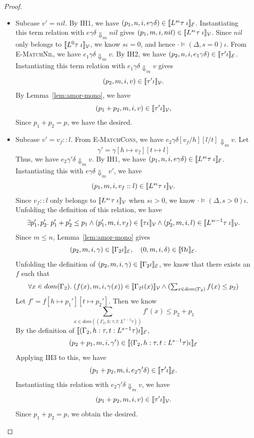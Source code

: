 \begin{proof}
\begin{itemize}
\begin{itemize}
  \item {Subcase $v'= nil$}.
By IH1, we have $(p_1,n,i,e\gamma\delta) \in \llbracket L^{s\iota}\tau\;\iota \rrbracket_{\mathcal{E}}$.
Instantiating this term relation with $e\gamma\delta\Downarrow_m nil$ gives
$(p_1,m,i,nil) \in \llbracket L^{s\iota}\tau\;\iota \rrbracket_{\mathcal{V}}$. Since $nil$ only belongs to $\llbracket L^0\tau\;\iota \rrbracket_{\mathcal{V}}$,
we know $s\iota = 0$, and hence $\cdot\models(\Delta,s=0)\iota$.
From \textsc{E-MatchNil}, we have $e_1\gamma\delta \Downarrow_m v$.
By IH2, we have $(p_2,n, i, e_1\gamma\delta) \in \llbracket \tau'\iota \rrbracket_{\mathcal{E}}$.
Instantiating this term relation with $e_1\gamma\delta \Downarrow_m v$ gives 
\[(p_2,m, i, v) \in \llbracket \tau'\iota \rrbracket_{\mathcal{V}}.\]
By Lemma~\ref{lem:amor-mono}, we have 
\[(p_1+p_2,m, i, v) \in \llbracket \tau'\iota \rrbracket_{\mathcal{V}},\]
Since $p_1+p_2 = p$, we have the desired.

\item Subcase $v'= v_f::l$.
From \textsc{E-MatchCons}, we have $e_2\gamma\delta[v_f/h][l/t]\Downarrow_m v$.
Let \[\gamma' = \gamma[h\mapsto v_f][t\mapsto l]\] Thus, we have $e_2\gamma'\delta\Downarrow_m v$.
By IH1, we have $(p_1,n,i,e\gamma\delta) \in \llbracket L^{s\iota}\tau\;\iota \rrbracket_{\mathcal{E}}$.
Instantiating this with $e\gamma\delta\Downarrow_m v'$, we have 
\[ (p_1,m, i,v_f::l) \in \llbracket L^{s\iota}\tau\;\iota \rrbracket_{\mathcal{V}}.\]
Since $v_f::l$ only belongs to $\llbracket L^{s\iota}\tau\;\iota \rrbracket_{\mathcal{V}}$ when $s\iota > 0$, we know $\cdot\models(\Delta,s>0)\iota$.
Unfolding the definition of this relation, we have 
\[
  \exists p_1',p_2'.\;p_1'+p_2' \leq p_1 \land
  (p_1',m,i,v_f) \in \llbracket \tau \iota \rrbracket_{\mathcal{V}} \land
  (p_2',m,i,l) \in \llbracket L^{s\iota-1}\tau\;\iota \rrbracket_{\mathcal{V}}.
\]
Since $m \leq n$, Lemma~\ref{lem:amor-mono} gives
\[(p_2, m, i, \gamma)\in\llbracket \Gamma_2\iota \rrbracket_{\mathcal{E}}, \quad (0, m, i, \delta)\in\llbracket \Omega\iota \rrbracket_{\mathcal{E}}.\]
Unfolding the definition of $(p_2,m, i, \gamma) \in \llbracket \Gamma_2\iota \rrbracket_{\mathcal{E}}$, we know that there exists an $f$ such that 
\[
  \forall x\in{dom}(\Gamma_2).\;(f(x),m,i,\gamma(x))\in\llbracket \Gamma_2\iota(x) \rrbracket_{\mathcal{V}} \land
        (\textstyle\sum_{x\in dom(\Gamma_2)}f(x)\leq p_2)
\]
Let $f' = f[h \mapsto p_1'][t \mapsto p_2']$. Then we know 
\[\textstyle\sum_{x\in dom((\Gamma_2, h:\tau, t:L^{s-1}\tau))}f'(x)\leq p_2+p_1\]
By the definition of $\llbracket (\Gamma_2, h:\tau, t:L^{s-1}\tau)\iota \rrbracket_{\mathcal{E}}$, 
\[ 
  (p_2+p_1, m, i, \gamma') \in \llbracket (\Gamma_2,h:\tau,t:L^{s-1}\tau)\iota \rrbracket_{\mathcal{E}}
\] 
Applying IH3 to this, we have 
\[(p_1+p_2, m, i, e_2\gamma'\delta) \in \llbracket \tau'\iota \rrbracket_{\mathcal{E}}.\]
Instantiating this relation with $e_2\gamma'\delta \Downarrow_m v$, we have 
\[(p_1+p_2, m, i, v) \in \llbracket \tau'\iota \rrbracket_{\mathcal{V}}.\]
Since $p_1+p_2=p$, we obtain the desired.
\end{itemize}


\end{itemize}
\end{proof}

